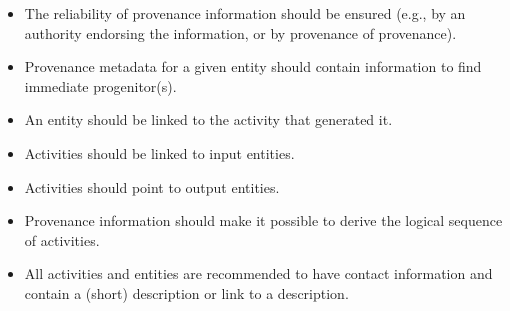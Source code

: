 \begin{itemize}


\item The reliability of provenance information should be ensured (e.g., by an authority endorsing the information, or by provenance of provenance).

\item Provenance metadata for a given entity should contain information to find immediate progenitor(s).

\item An entity should be linked to the activity that generated it.

\item Activities should be linked to input entities.

\item Activities should point to output entities.

\item Provenance information should make it possible to derive the logical sequence of activities.



\item All activities and entities are recommended to have contact information and contain a (short) description or link to a description.

\end{itemize}

